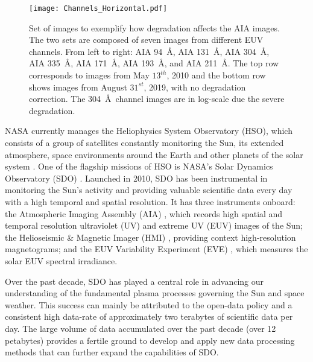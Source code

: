 \documentclass[twocolumn,usenames,dvipsnames]{aastex63}
\begin{document}
\begin{figure}[ht!]
    \texttt{[image: Channels\_Horizontal.pdf]}
    \caption{Set of images to exemplify how degradation affects the AIA images. The two sets are composed of seven images from different EUV channels. From left to right: AIA 94~\AA, AIA 131~\AA, AIA 304~\AA, AIA 335~\AA, AIA 171~\AA, AIA 193~\AA, and AIA 211~\AA. The top row corresponds to images from May $13^{th}$, 2010 and the bottom row shows images from August $31^{st}$, 2019, with no degradation correction. The 304~\AA~channel images are in log-scale due the severe degradation.}
    \label{fig:autocalibrate_model_problem}
\end{figure}

NASA currently manages the Heliophysics System Observatory (HSO), which consists of a group of satellites constantly monitoring the Sun, its extended atmosphere, space environments around the Earth and other planets of the solar system \citep{HSO}. One of the flagship missions of HSO is NASA's Solar Dynamics Observatory (SDO) \citep{SDO_primary}. Launched in 2010, SDO has been instrumental in monitoring the Sun's activity and providing valuable scientific data every day with a high temporal and spatial resolution. It has three instruments onboard: the Atmospheric Imaging Assembly (AIA) \citep{AIA}, which records high spatial and temporal resolution ultraviolet (UV) and extreme UV (EUV) images of the Sun; the Helioseismic \& Magnetic Imager (HMI) \citep{HMI}, providing context high-resolution magnetograms; and the EUV Variability Experiment (EVE) \citep{EVE}, which measures the solar EUV spectral irradiance.

Over the past decade, SDO has played a central role in advancing our understanding of the fundamental plasma processes governing the Sun and space weather. This success can mainly be attributed to the open-data policy and a consistent high data-rate of approximately two terabytes of scientific data per day. The large volume of data accumulated over the past decade (over 12 petabytes) provides a fertile ground to develop and apply new data processing methods that can further expand the capabilities of SDO.
\end{document}
